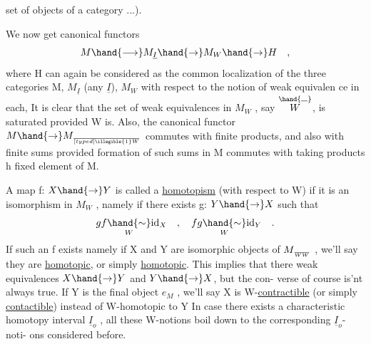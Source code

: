 set of objects of a category ...).

We now get canonical functors
\[ M\hand{\longrightarrow} M_{\underline{I}} \hand{\to} M_W \hand{\to} H \quad , \]
where H can again be considered as the common localization of the three
categories M, $M_{\underline{I}}$ (any $\underline{I}$), $M_W$ with respect to the notion of weak equivalen%
ce in each, It is clear that the set of weak equivalences in $M_W$ , say $\overset{\hand{\rule{0.65em}{0.4pt}}}{W}$,
is saturated provided W is. Also, the canonical functor $M\hand{\to} M_{\over[typed]{\illegible{1}}{W}}$ commutes
with finite products, and also with finite sums provided formation of
such sums in M commutes with taking products h  fixed element of M.

A map f: $X\hand{\to} Y$ is called a  \uline{homotopism} (with respect to W) if it is
an isomorphism in $M_W$ , namely if there exists g: $Y\hand{\to} X$ such that
\[ gf \underset{W}{\hand{\sim}} \mathrm{id}_X \quad , \quad fg \underset{W}{\hand{\sim}} \mathrm{id}_Y \quad . \]
\hand{\ensuremath{\unsure{\lozenge}}} If such an f exists namely if X and Y are isomorphic
objects of $M_{\over{W}{W}}$ , we'll say they are \uline{homotopic}, or simply \uline{homotopic}. This
implies that there  weak equivalences $X\hand{\to} Y$ and $Y\hand{\to} X$, but the con-%
verse of course is'nt always true. If Y is the final object $e_M$ , we'll
say X is W-\uline{contractible} (or simply \uline{contactible})  instead of
W-homotopic to Y In case there exists a characteristic homotopy
interval $\underline{I}_o$ , all these W-notions boil down to the corresponding $\underline{I}_o$-noti-%
ons considered before.


